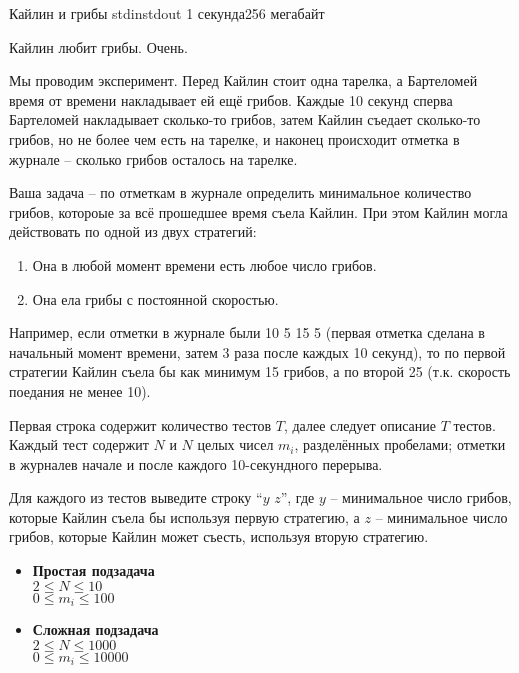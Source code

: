 
\begin{problem}{Кайлин и грибы}
{stdin}{stdout}
{1 секунда}{256 мегабайт}{}

Кайлин любит грибы. Очень.

Мы проводим эксперимент. Перед Кайлин стоит одна тарелка, а Бартеломей время от времени накладывает ей ещё грибов.
Каждые 10 секунд сперва Бартеломей накладывает сколько-то грибов, затем
Кайлин съедает сколько-то грибов, но не более чем есть на тарелке, и наконец происходит отметка в журнале -- сколько грибов осталось на тарелке.

Ваша задача -- по отметкам в журнале определить минимальное количество грибов, котороые за всё прошедшее время съела Кайлин.
При этом Кайлин могла действовать по одной из двух стратегий:
\begin{enumerate}
  \item Она в любой момент времени есть любое число грибов.
  \item Она ела грибы с постоянной скоростью.
\end{enumerate}

Например, если отметки в журнале были 10 5 15 5 (первая отметка сделана в начальный момент времени, затем 3 раза после каждых 10 секунд),
то по первой стратегии Кайлин съела бы как минимум 15 грибов, а по второй 25 (т.к. скорость поедания не менее 10).

\InputFile

Первая строка содержит количество тестов $T$, далее следует описание $T$ тестов.
Каждый тест содержит $N$ и $N$ целых чисел $m_i$, разделённых пробелами; отметки в журналев начале и после каждого 10-секундного перерыва.

\OutputFile

Для каждого из тестов выведите строку ``$y$ $z$'',
где $y$ -- минимальное число грибов, которые Кайлин съела бы используя первую стратегию,
а $z$ -- минимальное число грибов, которые Кайлин может съесть, используя вторую стратегию.

\Scoring

\begin{itemize}
  \item {\bf Простая подзадача} \\
	$2 \le N \le 10$ \\
	$0 \le m_i \le 100$
  \item {\bf Сложная подзадача} \\
	$2 \le N \le 1000$ \\
	$0 \le m_i \le 10000$
\end{itemize}

\Examples

\begin{example}
%
\end{example}

\end{problem}
